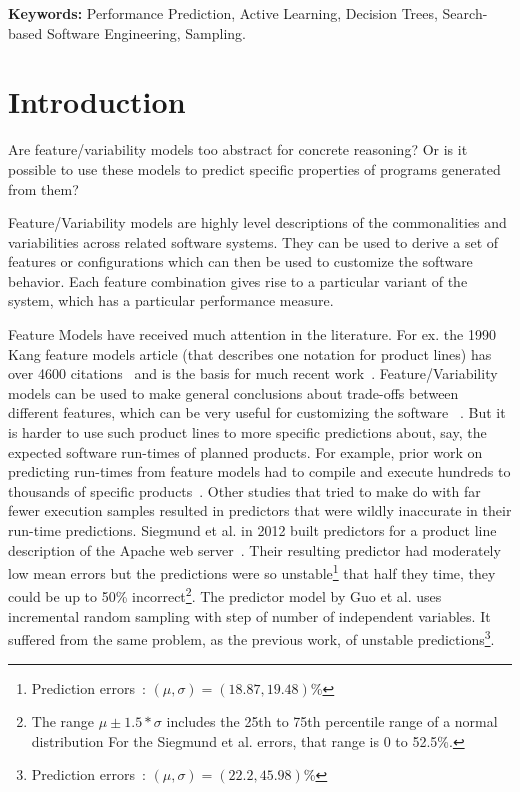 \documentclass{sig-alternative}
\begin{document}
 
\noindent
{\bf Keywords:} Performance Prediction, 
Active Learning, 
Decision Trees,
Search-based Software Engineering, Sampling.
 

 
\section{Introduction}
 
 Are feature/variability models too abstract for concrete reasoning?
Or is it possible to use these models to predict specific properties 
of programs generated from them? 

Feature/Variability models are highly level descriptions of the commonalities and variabilities   across related software systems. They can be used to derive a set of features or configurations which can then be used to customize the software behavior. Each feature combination gives rise to a particular variant of  the system, which has a particular performance measure.

Feature Models have received much attention in the literature.
For ex. the 1990 Kang feature models article (that describes one notation for product lines) has over 4600 citations~\cite{kang1990feature} and is the basis for 
much recent work~\cite{lopez15,harman14,sayyad13a,sayyad13b}.
Feature/Variability models can be used to make general conclusions about trade-offs between different features, which can be very useful for customizing the software ~\cite{sayyad13a,sayyad13b}. 
But it is harder to use
such product lines to more specific 
predictions about, say, the expected software run-times of planned products. 
For example, prior work on predicting run-times from feature models had  to compile and execute
hundreds to thousands of specific products~\cite{guo2013variability}. 
Other studies that tried to make do with   far fewer execution samples resulted
in predictors that were wildly inaccurate in their run-time predictions.
Siegmund et al. in 2012 built predictors for a product line description of the Apache web server~\cite{siegmund2012predicting}. Their resulting predictor had moderately low mean errors   but the predictions
 were  so  unstable\footnote{Prediction errors~\cite{siegmund2012predicting}: $(\mu,\sigma)=(18.87,19.48)$\%} that half they time, they could be up to 50\% incorrect\footnote{
 The range  $\mu \pm 1.5*\sigma$  includes the
 25th to 75th percentile range of a normal distribution   
For the Siegmund et al. errors, that range is  0 to 52.5\%.}. The predictor model by Guo et al. uses incremental random sampling with step of number of independent variables. It suffered from the same problem, as the previous work, of unstable predictions\footnote{Prediction errors~\cite{guo2013variability}: $(\mu,\sigma)=(22.2,45.98)$\%}.
 
\end{document}

